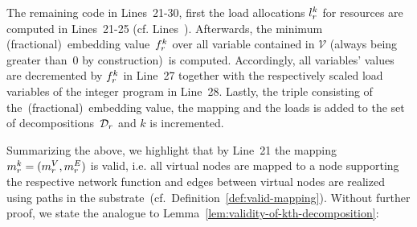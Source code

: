 \documentclass[10pt, conference, letterpaper]{IEEEtran}
\begin{document}
The remaining code in Lines~21-30, first the load allocations $\load$ for resources are computed in Lines~21-25 (cf. Lines~). Afterwards, the minimum (fractional)~embedding value~$f^k_{r}$ over all variable contained in $\mathcal{V}$ (always being greater than~$0$ by construction)~is computed. Accordingly, all variables' values are decremented by $\prob$ in Line~27 together with the respectively scaled load variables of the integer program in Line~28. Lastly, the triple consisting of the~(fractional)~embedding value, the mapping and the loads is added to the set of decompositions~$\mathcal{D}_{r}$ and $k$ is incremented.

Summarizing the above, we highlight that by Line~21 the mapping~$\mapping=(\mapV,\mapE)$ is valid, i.e. all virtual nodes are mapped to a node supporting the respective network function and edges between virtual nodes are realized using paths in the substrate~(cf.~Definition~\ref{def:valid-mapping}).  Without further proof, we state the analogue to Lemma~\ref{lem:validity-of-kth-decomposition}:
\end{document}
